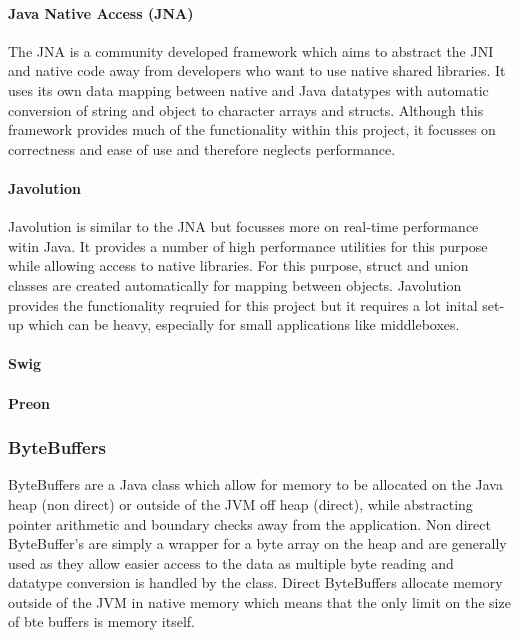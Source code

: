 \documentclass[final_report.tex]{subfiles}
\begin{document}
\paragraph*{Java Native Access (JNA)}
The JNA is a community developed framework which aims to abstract the JNI and native code away from developers who want to use native shared libraries. It uses its own data mapping between native and Java datatypes with automatic conversion of string and object to character arrays and structs. Although this framework provides much of the functionality within this project, it focusses on correctness and ease of use and therefore neglects performance.

\paragraph*{Javolution}
Javolution is similar to the JNA but focusses more on real-time performance witin Java. It provides a number of high performance utilities for this purpose while allowing access to native libraries. For this purpose, struct and union classes are created automatically for mapping between objects. Javolution provides the functionality reqruied for this project but it requires a lot inital set-up which can be heavy, especially for small applications like middleboxes.

\paragraph*{Swig}

\paragraph*{Preon}

\subsubsection{ByteBuffers}
ByteBuffers are a Java class which allow for memory to be allocated on the Java heap (non direct) or outside of the JVM off heap (direct), while abstracting pointer arithmetic and boundary checks away from the application. Non direct ByteBuffer's are simply a wrapper for a byte array on the heap and are generally used as they allow easier access to the data as multiple byte reading and datatype conversion is handled by the class. Direct ByteBuffers allocate memory outside of the JVM in native memory which means that the only limit on the size of bte buffers is memory itself.
\end{document}
